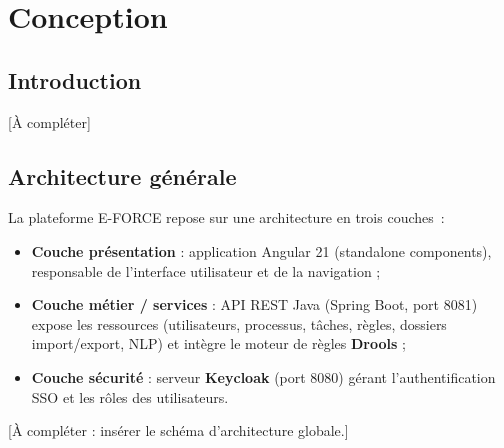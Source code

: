 \chapter{Conception}
\label{chap:conception}

\section{Introduction}

[\`A compl\'eter]

\section{Architecture g\'enérale}

La plateforme E-FORCE repose sur une architecture en trois couches~:

\begin{itemize}
    \item \textbf{Couche pr\'esentation} : application Angular 21
    (standalone components), responsable de l'interface utilisateur et
    de la navigation ;
    \item \textbf{Couche m\'etier / services} : API REST Java (Spring
    Boot, port 8081) expose les ressources (utilisateurs, processus,
    t\^aches, r\`egles, dossiers import/export, NLP) et int\`egre le moteur
    de r\`egles \textbf{Drools} ;
    \item \textbf{Couche s\'ecurit\'e} : serveur \textbf{Keycloak} (port
    8080) g\'erant l'authentification SSO et les r\^oles des utilisateurs.
\end{itemize}

[\`A compl\'eter : ins\'erer le sch\'ema d'architecture globale.]


